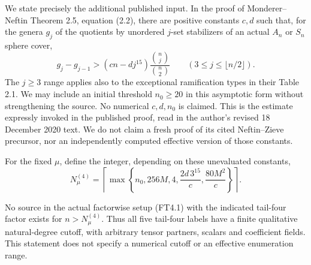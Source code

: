 We state precisely the additional published input. In the proof of
Monderer--Neftin Theorem 2.5, equation (2.2), there are positive constants
$c,d$ such that, for the genera $g_j$ of the quotients by unordered
$j$-set stabilizers of an actual $A_n$ or $S_n$ sphere cover,
\[
 g_j-g_{j-1}>(cn-dj^{15})
               \frac{\binom nj}{\binom n2}\qquad(3\le j\le\lfloor n/2\rfloor).
 \tag{FT4.11}
\]
The $j\ge3$ range applies also to the exceptional ramification types
in their Table 2.1.\cite[proof of Theorem~2.5, equation~(2.2)]{HD:MondererNeftin2022}
We may include an initial threshold $n_0\ge20$ in this asymptotic
form without strengthening the source. No numerical $c,d,n_0$ is claimed.
This is the estimate expressly invoked in the published proof, read in
the author's revised 18 December 2020 text. We do not claim a fresh
proof of its cited Neftin--Zieve precursor, nor an independently computed
effective version of those constants.

For the fixed $\mu$, define the integer, depending on these unevaluated
constants,
\[
 N_\mu^{(4)}=
 \left\lceil\max\left\{n_0,256M,4,
                  \frac{2d\,3^{15}}c,\frac{80M^2}c\right\}\right\rceil.
 \tag{FT4.12}
\]

\begin{theorem}[HD-FT10]
No source in the actual factorwise setup (FT4.1) with the indicated
tail-four factor exists for $n>N_\mu^{(4)}$.
Thus all five tail-four labels have a finite qualitative natural-degree
cutoff, with arbitrary tensor partners, scalars and coefficient fields.
This statement does not specify a numerical cutoff or an effective
enumeration range.
\end{theorem}

